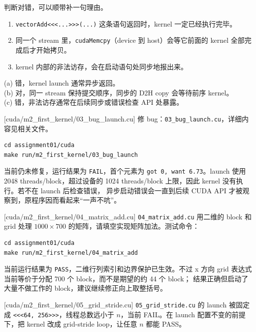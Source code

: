 \documentclass[11pt,a4paper,fontset=fandol]{ctexart}
\begin{document}
判断对错，可以顺带补一句理由。
\begin{enumerate}[label=(\alph*)]
  \item \texttt{vectorAdd<<<...>>>(...)} 这条语句返回时，kernel 一定已经执行完毕。
  \item 同一个 stream 里，\texttt{cudaMemcpy}（device 到 host）会等它前面的 kernel 全部完成后才开始拷贝。
  \item kernel 内部的非法访存，会在启动语句处同步地报出来。
\end{enumerate}

\begin{answer}
(a) 错，kernel launch 通常异步返回。\\
(b) 对，同一 stream 保持提交顺序，同步的 D2H copy 会等待前序 kernel。\\
(c) 错，非法访存通常在后续同步或错误检查 API 处暴露。
\end{answer}

[cuda/m2\_first\_kernel/03\_bug\_launch.cu]
修 bug：\texttt{03\_bug\_launch.cu}，详细内容见相关文件。

\begin{lstlisting}
cd assignment01/cuda
make run/m2_first_kernel/03_bug_launch
\end{lstlisting}

\begin{answer}
当前仍未修复，运行结果为 \texttt{FAIL}，首个元素为
\texttt{got 0, want 6.73}。launch 使用 2048 threads/block，超过设备的
1024 threads/block 上限，因此 kernel 没有执行。若不在 launch 后检查错误，
异步启动错误会一直到后续 CUDA API 才被观察到，原程序因而看起来“一声不吭”。
\end{answer}

[cuda/m2\_first\_kernel/04\_matrix\_add.cu]
\texttt{04\_matrix\_add.cu} 用二维的 block 和 grid 处理 $1000 \times 700$ 的矩阵，请填空实现矩阵加法。测试命令：

\begin{lstlisting}
cd assignment01/cuda
make run/m2_first_kernel/04_matrix_add
\end{lstlisting}

\begin{answer}
当前运行结果为 \texttt{PASS}，二维行列索引和边界保护已生效。不过 x 方向
grid 表达式当前等价于分配 700 个 block，而不是期望的约 44 个 block；
结果正确但启动了大量不做工作的 block，建议继续修正向上取整括号。
\end{answer}

[cuda/m2\_first\_kernel/05\_grid\_stride.cu]
\texttt{05\_grid\_stride.cu} 的 launch 被固定成 \texttt{<<<64, 256>>>}，线程总数远小于 $n$，当前 FAIL。在 launch 配置不变的前提下，把 kernel 改成 grid-stride loop，让任意 $n$ 都能 PASS。
\end{document}
